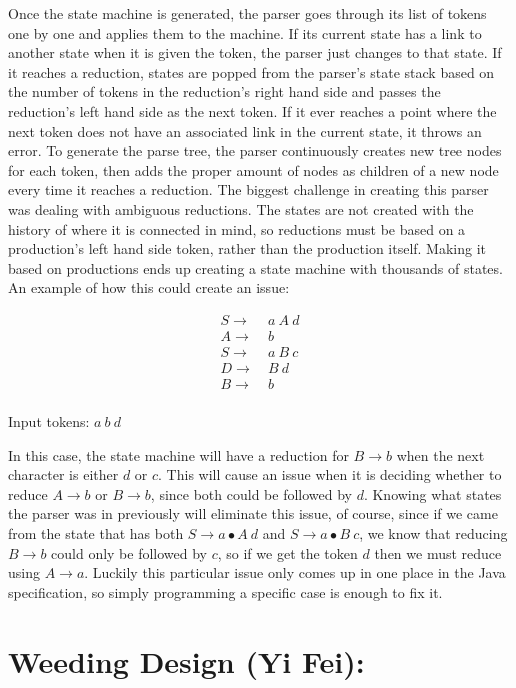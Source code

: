 \documentclass[12pt]{article}
\begin{document}
Once the state machine is generated, the parser goes through its list of tokens one by one and
applies them to the machine. If its current state has a link to another state when it is given the
token, the parser just changes to that state.  If it reaches a reduction, states are popped from the
parser’s state stack based on the number of tokens in the reduction’s right hand side and passes the
reduction’s left hand side as the next token.  If it ever reaches a point where the next token does
not have an associated link in the current state, it throws an error. To generate the parse tree,
the parser continuously creates new tree nodes for each token, then adds the proper amount of nodes
as children of a new node every time it reaches a reduction. The biggest challenge in creating this
parser was dealing with ambiguous reductions.  The states are not created with the history of where
it is connected in mind, so reductions must be based on a production’s left hand side token, rather
than the production itself.  Making it based on productions ends up creating a state machine with
thousands of states. An example of how this could create an issue:

\begin{align*}
S \rightarrow & \ a \ A \ d \\
A \rightarrow & \ b \\
S \rightarrow & \ a \ B \ c \\
D \rightarrow & \ B \ d \\
B \rightarrow & \ b \\
\end{align*}

Input tokens: $a \ b \ d$


In this case, the state machine will have a reduction for $B \rightarrow b$ when the next character
is either $d$ or $c$.  This will cause an issue when it is deciding whether to reduce $A \rightarrow
b$ or $B \rightarrow b$, since both could be followed by $d$.  Knowing what states the parser was in
previously will eliminate this issue, of course, since if we came from the state that has both $S
\rightarrow a \bullet A \ d$ and $S \rightarrow a \bullet B \ c$, we know that reducing $B
\rightarrow b$ could only be followed by $c$, so if we get the token $d$ then we must reduce using
$A \rightarrow a$.  Luckily this particular issue only comes up in one place in the Java
specification, so simply programming a specific case is enough to fix it.


\section*{Weeding Design (Yi Fei):}
\end{document}
